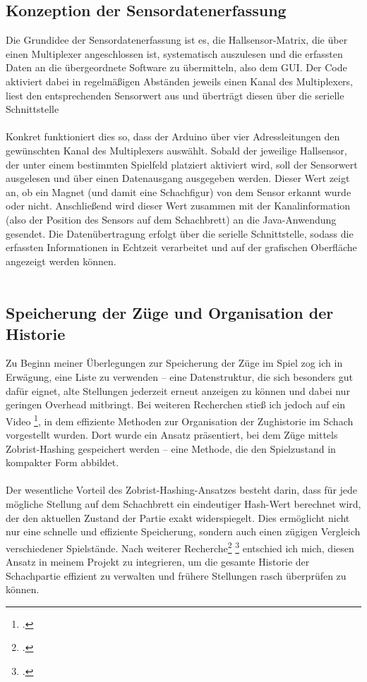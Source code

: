 \documentclass[a4paper]{article}
\begin{document}
\subsection{Konzeption der Sensordatenerfassung}
Die Grundidee der Sensordatenerfassung ist es, die Hallsensor-Matrix, die über einen Multiplexer angeschlossen ist, systematisch auszulesen und die erfassten Daten an die übergeordnete Software zu übermitteln, also dem GUI. Der Code aktiviert dabei in regelmäßigen Abständen jeweils einen Kanal des Multiplexers, liest den entsprechenden Sensorwert aus und überträgt diesen über die serielle Schnittstelle\\
\\
Konkret funktioniert dies so, dass der Arduino über vier Adressleitungen den gewünschten Kanal des Multiplexers auswählt. Sobald der jeweilige Hallsensor, der unter einem bestimmten Spielfeld platziert aktiviert wird, soll der Sensorwert ausgelesen und über einen Datenausgang ausgegeben werden. Dieser Wert zeigt an, ob ein Magnet (und damit eine Schachfigur) von dem Sensor erkannt wurde oder nicht. Anschließend wird dieser Wert zusammen mit der Kanalinformation (also der Position des Sensors auf dem Schachbrett) an die Java-Anwendung gesendet. Die Datenübertragung erfolgt über die serielle Schnittstelle, sodass die erfassten Informationen in Echtzeit verarbeitet und auf der grafischen Oberfläche angezeigt werden können.\\
\\
\subsection{Speicherung der Züge und Organisation der Historie}
Zu Beginn meiner Überlegungen zur Speicherung der Züge im Spiel zog ich in Erwägung, eine Liste zu verwenden – eine Datenstruktur, die sich besonders gut dafür eignet, alte Stellungen jederzeit erneut anzeigen zu können und dabei nur geringen Overhead mitbringt. Bei weiteren Recherchen stieß ich jedoch auf ein Video \footcite{zobrist_hashing_youtube}, in dem effiziente Methoden zur Organisation der Zughistorie im Schach vorgestellt wurden. Dort wurde ein Ansatz präsentiert, bei dem Züge mittels Zobrist-Hashing gespeichert werden – eine Methode, die den Spielzustand in kompakter Form abbildet.\\
\\
Der wesentliche Vorteil des Zobrist-Hashing-Ansatzes besteht darin, dass für jede mögliche Stellung auf dem Schachbrett ein eindeutiger Hash-Wert berechnet wird, der den aktuellen Zustand der Partie exakt widerspiegelt. Dies ermöglicht nicht nur eine schnelle und effiziente Speicherung, sondern auch einen zügigen Vergleich verschiedener Spielstände. Nach weiterer Recherche\footcite{wikipedia_zobrist} \footcite{Comptuerphile} entschied ich mich, diesen Ansatz in meinem Projekt zu integrieren, um die gesamte Historie der Schachpartie effizient zu verwalten und frühere Stellungen rasch überprüfen zu können.
\end{document}
